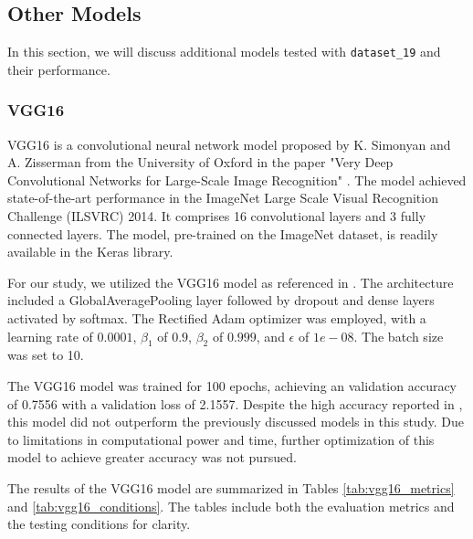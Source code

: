\subsection{Other Models}\label{s:other_models}

In this section, we will discuss additional models tested with \texttt{dataset\_19} and their performance.

\subsubsection{VGG16}\label{ss:vgg16}

VGG16 is a convolutional neural network model proposed by K. Simonyan and A. Zisserman from the University of Oxford in the paper "Very Deep Convolutional Networks for Large-Scale Image Recognition" \cite{simonyan_very_2015}. The model achieved state-of-the-art performance in the ImageNet Large Scale Visual Recognition Challenge (ILSVRC) 2014. It comprises 16 convolutional layers and 3 fully connected layers. The model, pre-trained on the ImageNet dataset, is readily available in the Keras library.

For our study, we utilized the VGG16 model as referenced in \cite{khaliki_brain_2024}. The architecture included a GlobalAveragePooling layer followed by dropout and dense layers activated by softmax. The Rectified Adam optimizer \cite{liu_variance_2019} was employed, with a learning rate of $0.0001$, $\beta_1$ of $0.9$, $\beta_2$ of $0.999$, and $\epsilon$ of $1e-08$. The batch size was set to 10.

The VGG16 model was trained for 100 epochs, achieving an validation accuracy of 0.7556 with a validation loss of 2.1557. Despite the high accuracy reported in \cite{khaliki_brain_2024}, this model did not outperform the previously discussed models in this study. Due to limitations in computational power and time, further optimization of this model to achieve greater accuracy was not pursued.

The results of the VGG16 model are summarized in Tables \ref{tab:vgg16_metrics} and \ref{tab:vgg16_conditions}. The tables include both the evaluation metrics and the testing conditions for clarity.

